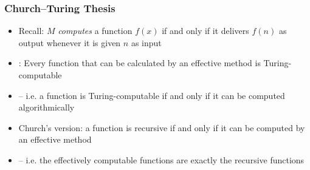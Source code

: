 \begin{frame}
\frametitle{Church--Turing Thesis}

\begin{itemize}[<+->]

\item Recall: $M$ \emph{computes} a function \(f(x)\) if and only if it delivers \(f(n)\) as output whenever it is given $n$ as input

\item {}: Every function that can be calculated by an effective method is Turing-computable

\item[]  -- i.e. a function is Turing-computable if and only if it can be computed algorithmically

\item Church's version: a function is recursive if and only if it can be computed by an effective method 

\item[] -- i.e. the effectively computable functions are exactly the recursive functions

\end{itemize}
\end{frame}

